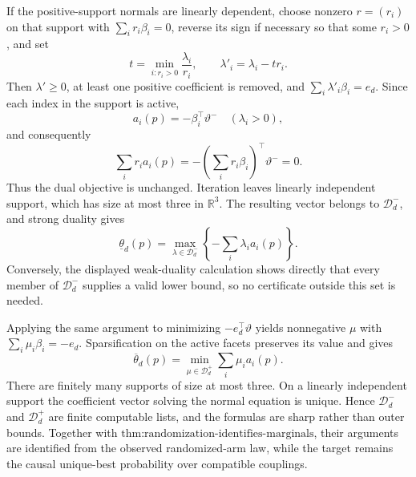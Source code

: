 If the positive-support normals are linearly dependent, choose nonzero \(r=(r_i)\) on that support with \(\sum_i r_i\beta_i=0\), reverse its sign if necessary so that some \(r_i>0\), and set
\[
 t=\min_{i:r_i>0}\frac{\lambda_i}{r_i},\qquad \lambda'_i=\lambda_i-tr_i.
\]
Then \(\lambda'\ge0\), at least one positive coefficient is removed, and \(\sum_i\lambda'_i\beta_i=e_d\).  Since each index in the support is active,
\[
 a_i(p)=-\beta_i^\top\vartheta^-\quad(\lambda_i>0),
\]
and consequently
\[
 \sum_i r_i a_i(p)=-\left(\sum_i r_i\beta_i\right)^\top\vartheta^-=0.
\]
Thus the dual objective is unchanged.  Iteration leaves linearly independent support, which has size at most three in \(\mathbb R^3\).  The resulting vector belongs to \(\mathcal D_d^-\), and strong duality gives
\[
 \underline\theta_d(p)=\max_{\lambda\in\mathcal D_d^-}
 \left\{-\sum_i\lambda_i a_i(p)\right\}.
\]
Conversely, the displayed weak-duality calculation shows directly that every member of \(\mathcal D_d^-\) supplies a valid lower bound, so no certificate outside this set is needed.

Applying the same argument to minimizing \(-e_d^\top\vartheta\) yields nonnegative \(\mu\) with \(\sum_i\mu_i\beta_i=-e_d\).  Sparsification on the active facets preserves its value and gives
\[
 \overline\theta_d(p)=\min_{\mu\in\mathcal D_d^+}\sum_i\mu_i a_i(p).
\]
There are finitely many supports of size at most three.  On a linearly independent support the coefficient vector solving the normal equation is unique.  Hence \(\mathcal D_d^-\) and \(\mathcal D_d^+\) are finite computable lists, and the formulas are sharp rather than outer bounds.  Together with \(\text{thm:randomization-identifies-marginals}\), their arguments are identified from the observed randomized-arm law, while the target remains the causal unique-best probability over compatible couplings.

